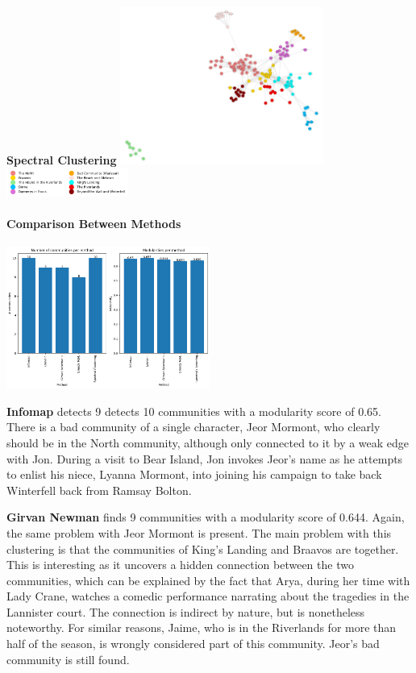 \documentclass[10pt,twocolumn,letterpaper]{article}
\begin{document}
\begin{center}
    \textbf{Spectral Clustering}
    \includegraphics[width=0.5\textwidth]{img/s6/communities_sc.jpg}
    \includegraphics[width=0.3\textwidth]{img/s6/sc_legend.jpg}\\
    \caption{\small{$\#communities=10$, $modularity=0.639$}}
\end{center}

\paragraph{Comparison Between Methods}

\begin{center}
    \includegraphics[width=0.5\textwidth]{img/s6/communities_comparison.jpg}
\end{center}

\textbf{Infomap} detects 9 detects 10 communities with a modularity score of 0.65. There is a bad community of a single character, Jeor Mormont, who clearly should be in the North community, although only connected to it by a weak edge with Jon. During a visit to Bear Island, Jon invokes Jeor's name as he attempts to enlist his niece, Lyanna Mormont, into joining his campaign to take back Winterfell back from Ramsay Bolton. 

\textbf{Girvan Newman} finds 9 communities with a modularity score of 0.644. Again, the same problem with Jeor Mormont is present. The main problem with this clustering is that the communities of King's Landing and Braavos are together. This is interesting as it uncovers a hidden connection between the two communities, which can be explained by the fact that Arya, during her time with Lady Crane, watches a comedic performance narrating about the tragedies in the Lannister court. The connection is indirect by nature, but is nonetheless noteworthy. For similar reasons, Jaime, who is in the Riverlands for more than half of the season, is wrongly considered part of this community. Jeor's bad community is still found.
\end{document}
